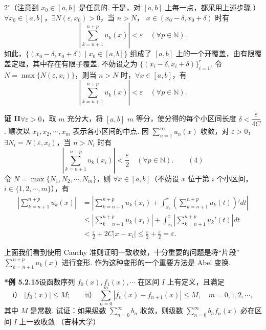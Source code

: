 \documentclass[UTF8,12pt,a4paper,fontset=fandol]{ctexart}
\begin{document}
$2^\circ$（注意到 $x_0\in[a,b]$ 是任意的. 于是，对 $[a,b]$ 上每一点，都采用上述步骤.）
$\forall x_0\in[a,b]$，$\exists N(\varepsilon,x_0)>0$，当 $n>N$，
$x\in(x_0-\delta,x_0+\delta)$ 时有
\[
  \left|\sum_{k=n+1}^{n+p}u_k(x)\right|<\varepsilon
  \quad(\forall p\in\mathbb N).
\]
如此，$\{(x_0-\delta,x_0+\delta)\mid x_0\in[a,b]\}$ 组成了 $[a,b]$ 上的一个开覆盖，由有限覆盖定理，其中存在有限子覆盖. 不妨设之为
$\{(x_i-\delta,x_i+\delta)\}_{i=1}^r$. 令
$N=\max\{N(\varepsilon,x_i)\}$，则当 $n>N$ 时，$\forall x\in[a,b]$，有
\[
  \left|\sum_{k=n+1}^{n+p}u_k(x)\right|<\varepsilon
  \quad(\forall p\in\mathbb N).
\]

\noindent\textbf{证 II}\quad $\forall\varepsilon>0$，取 $m$ 充分大，将 $[a,b]$ $m$ 等分，使分得的每个小区间长度
$\delta<\dfrac{\varepsilon}{4C}$. 顺次以 $x_1,x_2,\cdots,x_m$ 表示各小区间的中点. 因
$\displaystyle\sum_{n=1}^{\infty}u_n(x)$ 收敛，对 $\varepsilon>0$，$\exists N_i=N(\varepsilon,x_i)$，当
$n>N_i$ 时有
\[
  \left|\sum_{k=n+1}^{n+p}u_k(x_i)\right|<\frac{\varepsilon}{2}
  \quad(\forall p\in\mathbb N).
\qquad(4)
\]
令 $N=\max\{N_1,N_2,\cdots,N_m\}$，则 $\forall x\in[a,b]$（不妨设 $x$ 位于第 $i$ 个小区间，
$i\in\{1,2,\cdots,m\}$），有
\[
\begin{aligned}
\left|\sum_{k=n+1}^{n+p}u_k(x)\right|
&=\left|\sum_{k=n+1}^{n+p}u_k(x_i)
 +\int_{x_i}^x\left(\sum_{k=n+1}^{n+p}u_k(t)\right)'dt\right|\\
&\le\left|\sum_{k=n+1}^{n+p}u_k(x_i)\right|
 +\int_{x_i}^x\left|\sum_{k=n+1}^{n+p}u_k'(t)\right|dt\\
&<\frac{\varepsilon}{2}+2C|x-x_i|\le\frac{\varepsilon}{2}+\frac{\varepsilon}{2}=\varepsilon.
\end{aligned}
\]

上面我们看到使用 Cauchy 准则证明一致收敛，十分重要的问题是将“片段”
$\displaystyle\sum_{k=n+1}^{n+p}u_k(x)$ 进行变形. 作为这种变形的一个重要方法是 Abel 变换.

\noindent\textbf{*例 5.2.15}\quad 设函数序列 $f_0(x),f_1(x),\cdots$ 在区间 $I$ 上有定义，且满足
\[
  \text{i） }|f_0(x)|\le M;\qquad
  \text{ii） }\sum_{n=0}^m|f_n(x)-f_{n+1}(x)|\le M,\quad m=0,1,2,\cdots,
\]
其中 $M$ 是常数. 试证：如果级数 $\displaystyle\sum_{n=0}^{\infty}b_n$ 收敛，则级数
$\displaystyle\sum_{n=0}^{\infty}b_nf_n(x)$ 必在区间 $I$ 上一致收敛.（吉林大学）
\end{document}
